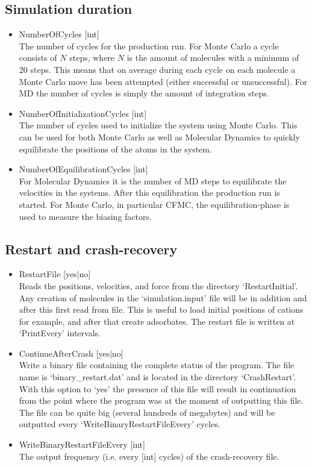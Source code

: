 \subsection*{Simulation duration}
\begin{itemize}
\item{NumberOfCycles [int]}\\
The number of cycles for the production run. 
For Monte Carlo a cycle consists of $N$ steps, where $N$ is the amount of
molecules with a minimum of 20 steps. This means that on average during each cycle on each molecule a
Monte Carlo move has been attempted (either successful or unsuccessful). For MD the number of cycles
is simply the amount of integration steps.
\item{NumberOfInitializationCycles [int]}\\
The number of cycles used to initialize the system using Monte Carlo. This can be used for both Monte Carlo
as well as Molecular Dynamics to quickly equilibrate the positions of the atoms in the system.
\item{NumberOfEquilibrationCycles [int]}\\
For Molecular Dynamics  it is the number of MD steps to equilibrate the velocities in the systems. After this 
equilibration the production run is started. For Monte Carlo, in particular CFMC, the equilibration-phase is used
to measure the biasing factors.
\end{itemize}

\subsection*{Restart and crash-recovery}
\begin{itemize}
\item{RestartFile [yes$|$no]}\\
Reads the positions, velocities, and force from the directory `RestartInitial'. Any creation of molecules
in the `simulation.input' file will be in addition and after this first read from file. This is useful to
load initial positions of cations for example, and after that create adsorbates. The restart file
is written at `PrintEvery' intervals.
\item{ContinueAfterCrash [yes$|$no]}\\
Write a binary file containing the complete status of the program. 
The file name is `binary\_restart.dat' and is located in the directory `CrashRestart'.
With this option to `yes' the presence of this file will result in continuation from
the point where the program was at the moment of outputting this file.
The file can be quite big (several hundreds of megabytes) and will be outputted every
`WriteBinaryRestartFileEvery' cycles.
\item{WriteBinaryRestartFileEvery [int]}\\
The output frequency (i.e. every [int] cycles) of the crash-recovery file.
\end{itemize}

